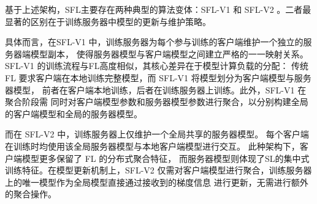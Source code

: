 基于上述架构，SFL主要存在两种典型的算法变体：SFL-V1 和 SFL-V2 \cite{thapa2022splitfed}。二者最显著的区别在于训练服务器中模型的更新与维护策略。

具体而言，在SFL-V1 中，训练服务器为每个参与训练的客户端维护一个独立的服务器端模型副本，
使得服务器模型与客户端模型之间建立严格的一一映射关系。
SFL-V1 的训练流程与FL高度相似，其核心差异在于模型计算负载的分配：
传统 FL 要求客户端在本地训练完整模型，而 SFL-V1 将模型划分为客户端模型与服务器模型，
前者在客户端本地训练，后者在训练服务器上训练。此外，SFL-V1 在聚合阶段需
同时对客户端模型参数和服务器模型参数进行聚合，以分别构建全局的客户端模型和全局的服务器模型。

而在 SFL-V2 中，训练服务器上仅维护一个全局共享的服务器模型。
每个客户端在训练时均使用该全局服务器模型与本地客户端模型进行交互。
此种架构下，客户端模型更多保留了 FL 的分布式聚合特征，
而服务器模型则体现了SL的集中式训练特征。在模型更新机制上，SFL-V2 
仅需对客户端模型进行聚合，训练服务器上的唯一模型作为全局模型直接通过接收到的梯度信息
进行更新，无需进行额外的聚合操作。





